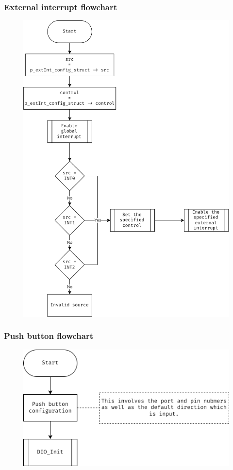 \documentclass[10pt]{article}
\begin{document}
\subsubsection{External interrupt flowchart}
\begin{figure}[H]
	\includegraphics[width=14cm]{external_interrupt_flowchart}
	\centering
\end{figure}

\subsubsection{Push button flowchart}
\begin{figure}[H]
	\includegraphics[width=14cm]{push_button_flowchart}
	\centering
\end{figure}
\end{document}
